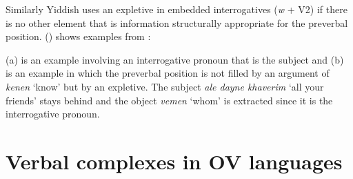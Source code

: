 Similarly Yiddish uses an expletive in embedded interrogatives (\emph{w} + V2) if 
there is no other element that is information structurally appropriate for the preverbal position.
() shows examples from \citet[--404]{Prince89a}:

\eal
{}
\zl
(a) is an example involving an interrogative pronoun that is the subject and (b) is an
example in which the preverbal position is not filled by an argument of \emph{kenen} `know' but by
an expletive. The subject \emph{ale dayne khaverim} `all your friends' stays behind and the object
\emph{vemen} `whom' is extracted since it is the interrogative pronoun.



\section{Verbal complexes in OV languages}


